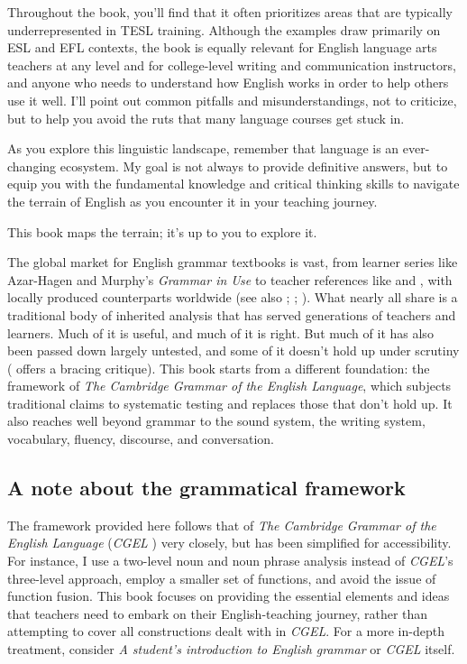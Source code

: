 Throughout the book, you'll find that it often prioritizes areas that are typically underrepresented in TESL training. Although the examples draw primarily on ESL and EFL contexts, the book is equally relevant for English language arts teachers at any level and for college-level writing and communication instructors, and anyone who needs to understand how English works in order to help others use it well. I'll point out common pitfalls and misunderstandings, not to criticize, but to help you avoid the ruts that many language courses get stuck in.

As you explore this linguistic landscape, remember that language is an ever-changing ecosystem. My goal is not always to provide definitive answers, but to equip you with the fundamental knowledge and critical thinking skills to navigate the terrain of English as you encounter it in your teaching journey.

This book maps the terrain; it's up to you to explore it.

The global market for English grammar textbooks is vast, from learner series like Azar-Hagen and Murphy's \emph{Grammar in Use} to teacher references like \textcite{LarsenFreeman2015} and \textcite{Parrott2010}, with locally produced counterparts worldwide (see also \citealt{Berry2021}; \citealt{ParkJohnson2020}; \citealt{Valenzuela2020}). What nearly all share is a traditional body of inherited analysis that has served generations of teachers and learners. Much of it is useful, and much of it is right. But much of it has also been passed down largely untested, and some of it doesn't hold up under scrutiny (\citealt{Pullum2024} offers a bracing critique). This book starts from a different foundation: the framework of \emph{The Cambridge Grammar of the English Language}, which subjects traditional claims to systematic testing and replaces those that don't hold up. It also reaches well beyond grammar to the sound system, the writing system, vocabulary, fluency, discourse, and conversation.

\subsection*{A note about the grammatical framework}

The framework provided here follows that of \textit{The Cambridge Grammar of the English Language} (\textit{CGEL} \cite{Huddleston2002}) very closely, but has been simplified for accessibility. For instance, I use a two-level noun and noun phrase analysis instead of \textit{CGEL}'s three-level approach, employ a smaller set of functions, and avoid the issue of function fusion. This book focuses on providing the essential elements and ideas that teachers need to embark on their English-teaching journey, rather than attempting to cover all constructions dealt with in \textit{CGEL}. For a more in-depth treatment, consider \textit{A student's introduction to English grammar} \citep{huddleston2021student} or \textit{CGEL} itself.

